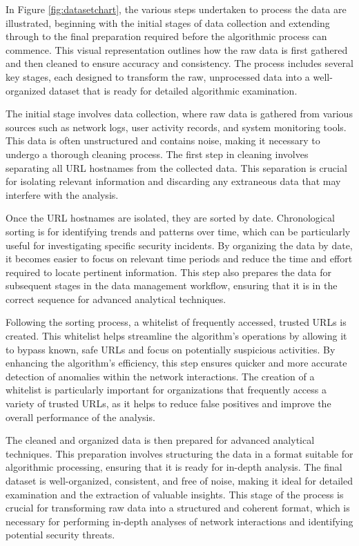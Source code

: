 In Figure \ref{fig:datasetchart}, the various steps undertaken to process the data are illustrated, beginning with the initial stages of data collection and extending through to the final preparation required before the algorithmic process can commence. This visual representation outlines how the raw data is first gathered and then cleaned to ensure accuracy and consistency. The process includes several key stages, each designed to transform the raw, unprocessed data into a well-organized dataset that is ready for detailed algorithmic examination.

The initial stage involves data collection, where raw data is gathered from various sources such as network logs, user activity records, and system monitoring tools. This data is often unstructured and contains noise, making it necessary to undergo a thorough cleaning process. The first step in cleaning involves separating all URL hostnames from the collected data. This separation is crucial for isolating relevant information and discarding any extraneous data that may interfere with the analysis.

Once the URL hostnames are isolated, they are sorted by date. Chronological sorting is for identifying trends and patterns over time, which can be particularly useful for investigating specific security incidents. By organizing the data by date, it becomes easier to focus on relevant time periods and reduce the time and effort required to locate pertinent information. This step also prepares the data for subsequent stages in the data management workflow, ensuring that it is in the correct sequence for advanced analytical techniques.

Following the sorting process, a whitelist of frequently accessed, trusted URLs is created. This whitelist helps streamline the algorithm's operations by allowing it to bypass known, safe URLs and focus on potentially suspicious activities. By enhancing the algorithm's efficiency, this step ensures quicker and more accurate detection of anomalies within the network interactions. The creation of a whitelist is particularly important for organizations that frequently access a variety of trusted URLs, as it helps to reduce false positives and improve the overall performance of the analysis.

The cleaned and organized data is then prepared for advanced analytical techniques. This preparation involves structuring the data in a format suitable for algorithmic processing, ensuring that it is ready for in-depth analysis. The final dataset is well-organized, consistent, and free of noise, making it ideal for detailed examination and the extraction of valuable insights. This stage of the process is crucial for transforming raw data into a structured and coherent format, which is necessary for performing in-depth analyses of network interactions and identifying potential security threats.

